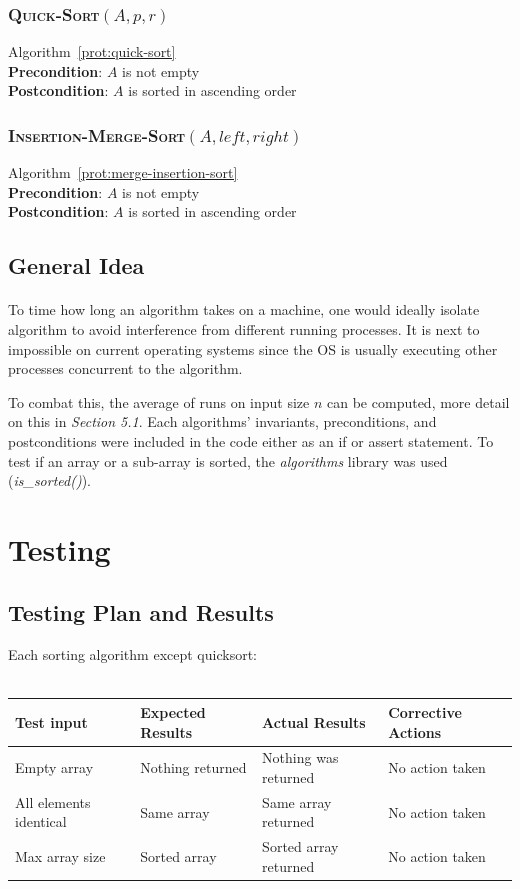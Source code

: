 \documentclass[onecolumn, letterpaper, 12pt]{article}
\begin{document}
		\subsubsection{\textsc{Quick-Sort}$(A, p, r)$}
			\footnotesize
			Algorithm~\ref{prot:quick-sort}\\
			\textbf{Precondition}: $A$ is not empty\\
			\textbf{Postcondition}: $A$ is sorted in ascending order
			\normalsize
		\subsubsection{\textsc{Insertion-Merge-Sort}$(A, left, right)$}
			\footnotesize
			Algorithm~\ref{prot:merge-insertion-sort}\\
			\textbf{Precondition}: $A$ is not empty\\
			\textbf{Postcondition}: $A$ is sorted in ascending order
	\normalsize
	\subsection{General Idea}
		\paragraph{}
		To time how long an algorithm takes on a machine, one would ideally isolate algorithm to avoid interference from different running processes. It is next to impossible on current operating systems since the OS is usually executing other processes concurrent to the algorithm. 
		
		To combat this, the average of runs on input size $n$ can be computed, more detail on this in \textit{Section 5.1}. Each algorithms' invariants, preconditions, and postconditions were included in the code either as an if or assert statement. To test if an array or a sub-array is sorted, the \textit{algorithms} library was used (\textit{is\_sorted()}).
\section{Testing}
	\subsection{Testing Plan and Results}
		Each sorting algorithm except quicksort:\\\\
		\small{\begin{tabular}{|l|l|l|l|}
		\hline Test input & Expected Results & Actual Results & Corrective Actions \\ 
		\hline  Empty array & Nothing returned  & Nothing was returned & No action taken  \\ 
		\hline All elements identical & Same array  & Same array returned & No action taken  \\ 
		\hline Max array size & Sorted array & Sorted array returned & No action taken \\
		\hline
		\end{tabular}}\\
		
\end{document}
